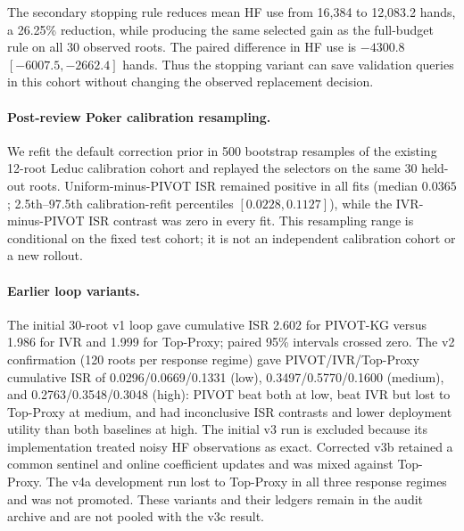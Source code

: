 \documentclass{article}
\begin{document}
The secondary stopping rule reduces mean HF use from 16,384 to 12,083.2 hands,
a 26.25\% reduction, while producing the same selected gain as the full-budget
rule on all 30 observed roots. The paired difference in HF use is $-4300.8$
$[-6007.5,-2662.4]$ hands. Thus the stopping variant can save validation
queries in this cohort without changing the observed replacement decision.

\paragraph{Post-review Poker calibration resampling.}
We refit the default correction prior in 500 bootstrap resamples of the
existing 12-root Leduc calibration cohort and replayed the selectors on the
same 30 held-out roots. Uniform-minus-PIVOT ISR remained positive in all fits
(median $0.0365$; 2.5th--97.5th calibration-refit percentiles
$[0.0228,0.1127]$), while the IVR-minus-PIVOT ISR contrast was zero in every
fit. This resampling range is conditional on the fixed test cohort; it is not
an independent calibration cohort or a new rollout.

\paragraph{Earlier loop variants.}
The initial 30-root v1 loop gave cumulative ISR 2.602 for PIVOT-KG versus
1.986 for IVR and 1.999 for Top-Proxy; paired 95\% intervals crossed zero.
The v2 confirmation (120 roots per response regime) gave PIVOT/IVR/Top-Proxy
cumulative ISR of 0.0296/0.0669/0.1331 (low), 0.3497/0.5770/0.1600
(medium), and 0.2763/0.3548/0.3048 (high): PIVOT beat both at low, beat IVR
but lost to Top-Proxy at medium, and had inconclusive ISR contrasts and lower
deployment utility than both baselines at high.
The initial v3 run is excluded because its implementation treated noisy HF
observations as exact. Corrected v3b retained a common sentinel and online
coefficient updates and was mixed against Top-Proxy. The v4a development run
lost to Top-Proxy in all three response regimes and was not promoted. These
variants and their ledgers remain in the audit archive and are not pooled with
the v3c result.
\end{document}
